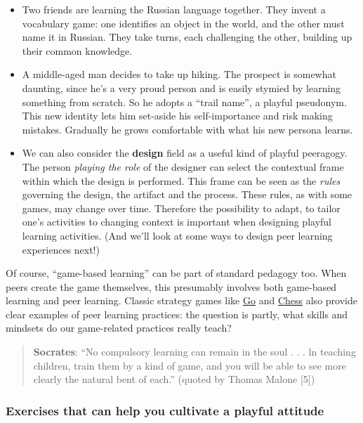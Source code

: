 \begin{itemize}
\item
  Two friends are learning the Russian language together. They invent a
  vocabulary game: one identifies an object in the world, and the other
  must name it in Russian. They take turns, each challenging the other,
  building up their common knowledge.
\item
  A middle-aged man decides to take up hiking. The prospect is somewhat
  daunting, since he's a very proud person and is easily stymied by
  learning something from scratch. So he adopts a ``trail name'', a
  playful pseudonym. This new identity lets him set-aside his
  self-importance and risk making mistakes. Gradually he grows
  comfortable with what his new persona learns.
\item
  We can also consider the \textbf{design} field as a useful kind of
  playful peeragogy. The person \emph{playing the role} of the designer
  can select the contextual frame within which the design is performed.
  This frame can be seen as the \emph{rules} governing the design, the
  artifact and the process. These rules, as with some games, may change
  over time. Therefore the possibility to adapt, to tailor one's
  activities to changing context is important when designing playful
  learning activities. (And we'll look at some ways to design peer
  learning experiences next!)
\end{itemize}
Of course, ``game-based learning'' can be part of standard pedagogy too.
When peers create the game themselves, this presumably involves both
game-based learning and peer learning. Classic strategy games like
\href{http://senseis.xmp.net/?MythOfOrigin}{Go} and
\href{http://www.amazon.com/Chess-Success-Using-Strengths-Children/dp/0767915682}{Chess}
also provide clear examples of peer learning practices: the question is
partly, what skills and mindsets do our game-related practices really
teach?

\begin{quote}
\textbf{Socrates}: ``No compulsory learning can remain in the soul . . .
ln teaching children, train them by a kind of game, and you will be able
to see more clearly the natural bent of each.'' (quoted by Thomas Malone
{[}5{]})
\end{quote}
\subsubsection{Exercises that can help you cultivate a playful attitude}

